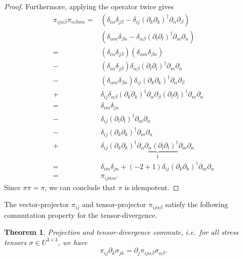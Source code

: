 \documentclass[preprint,twocolumn,5p]{elsarticle}
\newtheorem{theorem}{Theorem}
\begin{document}
\begin{proof}
    Furthermore, applying the operator twice gives
    \begin{equation}
    \begin{split}
        \pi_{i j \alpha \beta} \pi_{\alpha \beta m n} =
        & \left( \delta_{i \alpha} \delta_{j \beta} - \delta_{i j} (\partial_k \partial_k)^{\dagger}
        \partial_\alpha \partial_\beta \right) \\
        & \left( \delta_{\alpha m} \delta_{\beta n} - \delta_{\alpha \beta} (\partial_l \partial_l)^{\dagger} \partial_m \partial_n \right) \\
        = &
        (\delta_{i \alpha} \delta_{j \beta}) (\delta_{\alpha m} \delta_{\beta n}) \\
        - &
        (\delta_{i \alpha} \delta_{j \beta}) \delta_{\alpha \beta} (\partial_l \partial_l)^{\dagger} \partial_m \partial_n \\
        - &
        (\delta_{\alpha m} \delta_{\beta n}) \delta_{i j} (\partial_k \partial_k)^{\dagger} \partial_\alpha \partial_\beta \\
        + &
        \delta_{i j} \delta_{\alpha \beta}
        (\partial_k \partial_k)^{\dagger} \partial_\alpha \partial_\beta
        (\partial_l \partial_l)^{\dagger} \partial_m \partial_n \\
        = &
        \delta_{i m} \delta_{j n} \\
        - & \delta_{i j} (\partial_l \partial_l)^{\dagger} \partial_m \partial_n \\
        - & \delta_{i j} (\partial_k \partial_k)^{\dagger} \partial_m \partial_n \\
        + & \delta_{i j} (\partial_k \partial_k)^{\dagger}
        \underbrace{\partial_\alpha \partial_\alpha (\partial_l
        \partial_l)^{\dagger}}_{1}
        \partial_m \partial_n \\
        = & \delta_{i m} \delta_{j n} + (-2 + 1) \delta_{i j} (\partial_k \partial_k)^{\dagger} \partial_m \partial_n \\
        = & \pi_{i j m n}.
    \end{split}
    \end{equation}
    Since $\pi \pi = \pi$, we
    can conclude that $\pi$ is idempotent.
\end{proof}

The vector-projector $\pi_{i j}$ and tensor-projector $\pi_{i j \alpha \beta}$
satisfy the following commutation property for the tensor-divergence.

\begin{theorem} \label{th:projection-commutation}
    Projection and tensor-divergence commute, i.e.\ for all stress tensors
    $\sigma \in U^{3 \times 3}$, we have
    \begin{equation}
        \pi_{i j} \partial_k \sigma_{j k} = \partial_j \pi_{i j \alpha \beta} \sigma_{\alpha \beta}.
    \end{equation}
\end{theorem}
\end{document}
